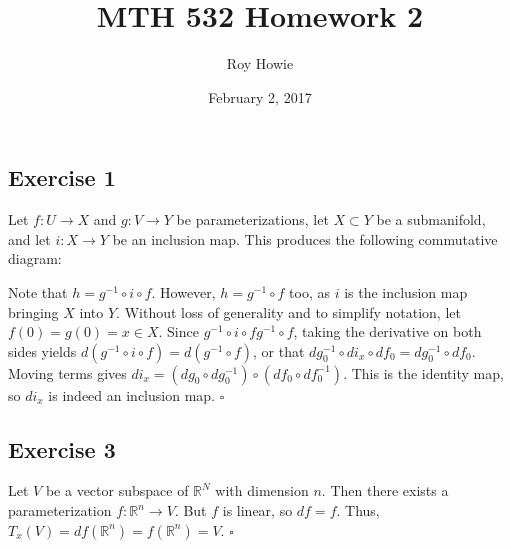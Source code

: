\documentclass{article}
\newcommand{\R}{\mathbb{R}}
\begin{document}
\title{MTH 532 Homework 2}
\author{Roy Howie}
\date{February 2, 2017}
\maketitle

\subsection*{Exercise 1}
  Let $f\colon U\to X$ and $g\colon V\to Y$ be parameterizations, let $X\subset
  Y$ be a submanifold, and let $i\colon X\to Y$ be an inclusion map. This
  produces the following commutative diagram:
  \begin{center}
  \end{center}
  Note that $h=g^{-1}\circ i\circ f$. However, $h=g^{-1}\circ f$ too, as $i$ is
  the inclusion map bringing $X$ into $Y$. Without loss of generality and to
  simplify notation, let $f(0)=g(0)=x\in X$. Since $g^{-1}\circ i\circ f g^{-1}
  \circ f$, taking the derivative on both sides yields $d(g^{-1}\circ i\circ f)=
  d(g^{-1}\circ f)$, or that
    $dg^{-1}_0\circ di_x\circ df_0=dg^{-1}_0\circ df_0$.
  Moving terms gives $di_x=(dg_0\circ dg^{-1}_0)\circ(df_0\circ df^{-1}_0)$.
  This is the identity map, so $di_x$ is indeed an inclusion map.
  \hfill $\square$

\subsection*{Exercise 3}
  Let $V$ be a vector subspace of $\R^N$ with dimension $n$. Then there exists a
  parameterization $f\colon\R^n\to V$. But $f$ is linear, so $df=f$. Thus,
  $T_x(V)=df(\R^n)=f(\R^n)=V$.
  \hfill $\square$
\end{document}
